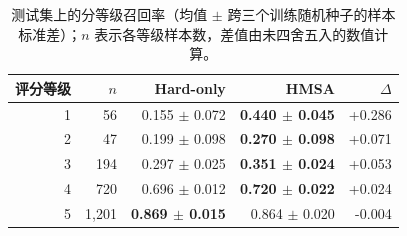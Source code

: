 \begin{table}[H]
\centering
\caption{测试集上的分等级召回率（均值 $\pm$ 跨三个训练随机种子的样本标准差）；$n$ 表示各等级样本数，差值由未四舍五入的数值计算。}
\label{tab:recall}
\small
\begin{tabular}{rrrrr}
\toprule
评分等级 & $n$ & Hard-only & HMSA & $\Delta$ \\
\midrule
1 & 56 & 0.155 $\pm$ 0.072 & \textbf{0.440 $\pm$ 0.045} & +0.286 \\
2 & 47 & 0.199 $\pm$ 0.098 & \textbf{0.270 $\pm$ 0.098} & +0.071 \\
3 & 194 & 0.297 $\pm$ 0.025 & \textbf{0.351 $\pm$ 0.024} & +0.053 \\
4 & 720 & 0.696 $\pm$ 0.012 & \textbf{0.720 $\pm$ 0.022} & +0.024 \\
5 & 1,201 & \textbf{0.869 $\pm$ 0.015} & 0.864 $\pm$ 0.020 & -0.004 \\
\bottomrule
\end{tabular}
\end{table}
